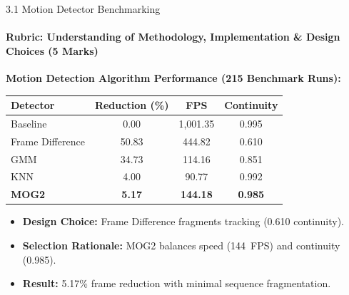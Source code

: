 \documentclass[aspectratio=169, 11pt]{beamer}
\begin{document}
\begin{frame}{3.1 Motion Detector Benchmarking}
    \framesubtitle{Rubric: Understanding of Methodology, Implementation \& Design Choices (5 Marks)}
    \centering
    \textbf{Motion Detection Algorithm Performance (215 Benchmark Runs):}
    \vspace{0.2cm}
    \begin{table}
        \centering
        \small
        \renewcommand{\arraystretch}{1.1}
        \begin{tabular}{lccc}
            \toprule
            \textbf{Detector} & \textbf{Reduction (\%)} & \textbf{FPS} & \textbf{Continuity} \\
            \midrule
            Baseline & 0.00 & 1{,}001.35 & 0.995 \\
            Frame Difference & 50.83 & 444.82 & 0.610 \\
            GMM & 34.73 & 114.16 & 0.851 \\
            KNN & 4.00 & 90.77 & 0.992 \\
            \textbf{MOG2} & \textbf{5.17} & \textbf{144.18} & \textbf{0.985} \\
            \bottomrule
        \end{tabular}
    \end{table}
    \vspace{0.5cm}
    \begin{itemize}
        \item \textbf{Design Choice:} Frame Difference fragments tracking (0.610 continuity).
        \item \textbf{Selection Rationale:} MOG2 balances speed (144~FPS) and continuity (0.985).
        \item \textbf{Result:} 5.17\% frame reduction with minimal sequence fragmentation.
    \end{itemize}
\end{frame}
\end{document}
